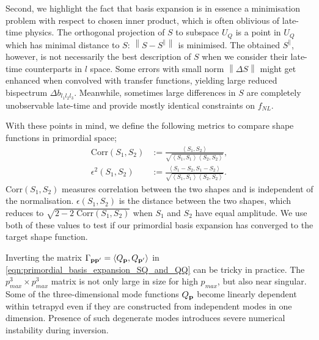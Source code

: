 Second, we highlight the fact that basis expansion is in essence a minimisation problem with respect to chosen inner product, which is often oblivious of late-time physics. The orthogonal projection of $S$ to subspace $U_Q$ is a point in $U_Q$ which has minimal distance to $S$: $\left\| S - S^\parallel \right\|$ is minimised. The obtained $S^\parallel$, however, is not necessarily the best description of $S$ when we consider their late-time counterparts in $l$ space. Some errors with small norm $\left\| \Delta S \right\|$ might get enhanced when convolved with transfer functions, yielding large reduced bispectrum $\Delta b_{l_1 l_2 l_3}$. Meanwhile, sometimes large differences in $S$ are completely unobservable late-time and provide mostly identical constraints on $f_{NL}$.

With these points in mind, we define the following metrics to compare shape functions in primordial space;
\begin{align}
	\text{Corr}(S_1, S_2) &:= \frac{\left< S_1, S_2 \right>}{ \sqrt{ \left< S_1, S_1 \right> \left< S_2, S_2 \right> } }, \\
	\epsilon^2(S_1, S_2) &:= \frac{\left< S_1 - S_2, S_1 - S_2 \right> }{\sqrt{\left< S_1, S_1 \right> \left< S_2, S_2 \right>}}. \label{def:primordial_shape_epsilon}
\end{align}
Corr$(S_1,S_2)$ measures correlation between the two shapes and is independent of the normalisation. $\epsilon(S_1,S_2)$ is the distance between the two shapes, which reduces to $\sqrt{2 - 2\;\text{Corr}(S_1,S_2)}$ when $S_1$ and $S_2$ have equal amplitude. We use both of these values to test if our primordial basis expansion has converged to the target shape function. 

Inverting the matrix $\Gamma_{\mathbf{p} \mathbf{p}'} = \left< Q_\mathbf{p}, Q_{\mathbf{p}'} \right>$ in \eqref{eqn:primordial_basis_expansion_SQ_and_QQ} can be tricky in practice. The $p_{max}^3 \times p_{max}^3$ matrix is not only large in size for high $p_{max}$, but also near singular. Some of the three-dimensional mode functions $Q_\mathbf{p}$ become linearly dependent within tetrapyd even if they are constructed from independent modes in one dimension. Presence of such degenerate modes introduces severe numerical instability during inversion.

